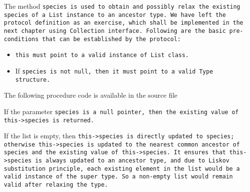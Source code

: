 The method \tt{species} is used to obtain and possibly relax the
existing \tt{species} of a \tt{List} instance to an ancestor type.
We have left the protocol definition as an exercise, which shall
be implemented in the next chapter using \tt{Collection} interface.
Following are the basic pre-conditions that can be established by the protocol:

\begin{itemize}

\item \tt{this} must point to a valid instance of \tt{List} class.

\item If \tt{species} is not null, then it
must point to a valid \tt{Type} structure.

\end{itemize}

The following procedure code is available in the source file

If the parameter \tt{species} is a null pointer, then
the existing value of \tt{this->species} is returned.

If the list is empty, then \tt{this->species} is directly updated to \tt{species};
otherwise \tt{this->species} is updated to the nearest common ancestor
of \tt{species} and the existing value of \tt{this->species}.
It ensures that \tt{this->species} is always updated to an ancestor type,
and due to Liskov substitution principle, each existing element
in the list would be a valid instance of the super type.
So a non-empty list would remain valid after relaxing the type.
